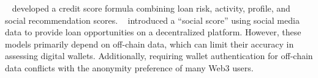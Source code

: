 \documentclass[runningheads]{llncs}
\begin{document}
{\citeauthor{uriawan2024decentralized}~\cite{uriawan2024decentralized} developed a credit score formula combining loan risk, activity, profile, and social recommendation scores.
\citeauthor{hartmann2023privacy}~\cite{hartmann2023privacy} introduced a ``social score'' using social media data to provide loan opportunities on a decentralized platform. However, these models primarily depend on off-chain data, which can limit their accuracy in assessing digital wallets. Additionally, requiring wallet authentication for off-chain data conflicts with the anonymity preference of many Web3 users.


}
\end{document}
